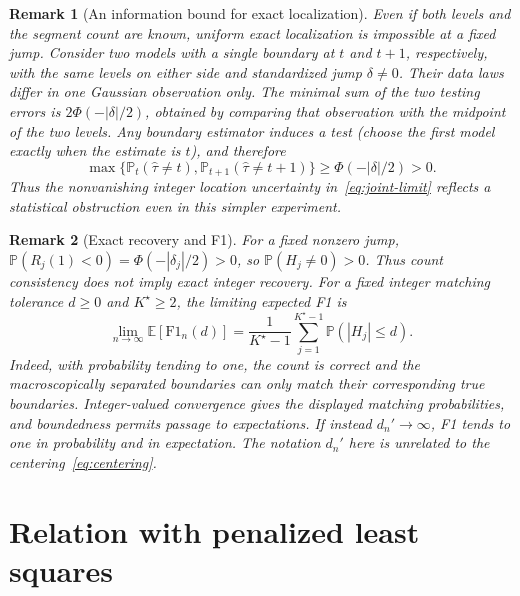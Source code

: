 \documentclass[pdflatex,sn-mathphys-num]{sn-jnl}
\newcommand{\Prob}{\mathbb P}
\newcommand{\E}{\mathbb E}
\theoremstyle{thmstyleone}
\theoremstyle{thmstyletwo}
\newtheorem{remark}{Remark}
\begin{document}
\begin{remark}[An information bound for exact localization]
Even if both levels and the segment count are known, uniform exact
localization is impossible at a fixed jump. Consider two models with a
single boundary at $t$ and $t+1$, respectively, with the same levels on
either side and standardized jump $\delta\ne0$. Their data laws differ in
one Gaussian observation only. The minimal sum of the two testing errors
is $2\Phi(-|\delta|/2)$, obtained by comparing that observation with the
midpoint of the two levels. Any boundary estimator induces a test (choose
the first model exactly when the estimate is $t$), and therefore
\[
\max\{\Prob_t(\widehat\tau\ne t),
\Prob_{t+1}(\widehat\tau\ne t+1)\}\ge\Phi(-|\delta|/2)>0.
\]
Thus the nonvanishing integer location uncertainty in~\eqref{eq:joint-limit}
reflects a statistical obstruction even in this simpler experiment.
\end{remark}

\begin{remark}[Exact recovery and F1]
For a fixed nonzero jump, $\Prob(R_j(1)<0)=\Phi(-|\delta_j|/2)>0$, so
$\Prob(H_j\ne0)>0$. Thus count consistency does not imply exact integer
recovery. For a fixed integer matching tolerance $d\ge0$ and $K^\star\ge2$,
the limiting expected F1 is
\[
\lim_{n\to\infty}\E[\mathrm{F1}_n(d)]
=\frac{1}{K^\star-1}\sum_{j=1}^{K^\star-1}\Prob(|H_j|\le d).
\]
Indeed, with probability tending to one, the count is correct and the
macroscopically separated boundaries can only match their corresponding
true boundaries. Integer-valued convergence gives the displayed matching
probabilities, and boundedness permits passage to expectations.
If instead $d_n'\to\infty$, F1 tends to one in probability and in expectation.
The notation $d_n'$ here is unrelated to the centering~\eqref{eq:centering}.
\end{remark}

\section{Relation with penalized least squares}\label{sec:coupling}
\end{document}
